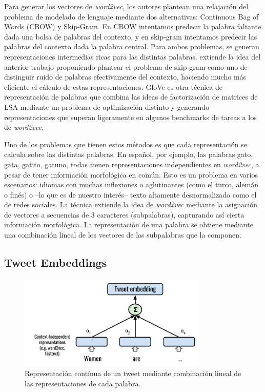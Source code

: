 Para generar los vectores de \emph{word2vec}, los autores plantean una relajación del problema de modelado de lenguaje mediante dos alternativas: Continuous Bag of Words (CBOW) y Skip-Gram. En CBOW intentamos predecir la palabra faltante dada una bolsa de palabras del contexto, y en skip-gram intentamos predecir las palabras del contexto dada la palabra central. Para ambos problemas, se generan representaciones intermedias ricas para las distintas palabras. \citet{mikolov2013efficient} extiende la idea del anterior trabajo proponiendo plantear el problema de skip-gram como uno de distinguir ruido de palabras efectivamente del contexto, haciendo mucho más eficiente el cálculo de estas representaciones. GloVe \cite{pennington2014glove} es otra técnica de representación de palabras que combina las ideas de factorización de matrices de LSA  mediante un problema de optimización distinto y generando representaciones que superan ligeramente en algunos benchmarks de tareas a los de \emph{word2vec}.

Uno de los problemas que tienen estos métodos es que cada representación se calcula sobre las distintas palabras. En español, por ejemplo, las palabras gato, gata, gatito, gatuno, todas tienen representaciones independientes en \emph{word2vec}, a pesar de tener información morfológica en común. Esto es un problema en varios escenarios: idiomas con muchas inflexiones o aglutinantes (como el turco, alemán o finés) o --lo que es de nuestro interés-- texto altamente desnormalizado como el de redes sociales. La técnica \fasttext{} \cite{bojanowski16} extiende la idea de \emph{word2vec} mediante la asignación de vectores a secuencias de 3 caracteres (subpalabras), capturando así cierta información morfológica. La representación de una palabra se obtiene mediante una combinación lineal de los vectores de las subpalabras que la componen.

\subsection{Tweet Embeddings}
\label{sec:02_tweet_embeddings}


\begin{figure}[t]
    \centering
    \includegraphics[width=0.80\textwidth]{img/tweet_embeddings.pdf}
    \caption{Representación contínua de un tweet mediante combinación lineal de las representaciones de cada palabra.}
    \label{fig:tweet_embeddings}
\end{figure}

